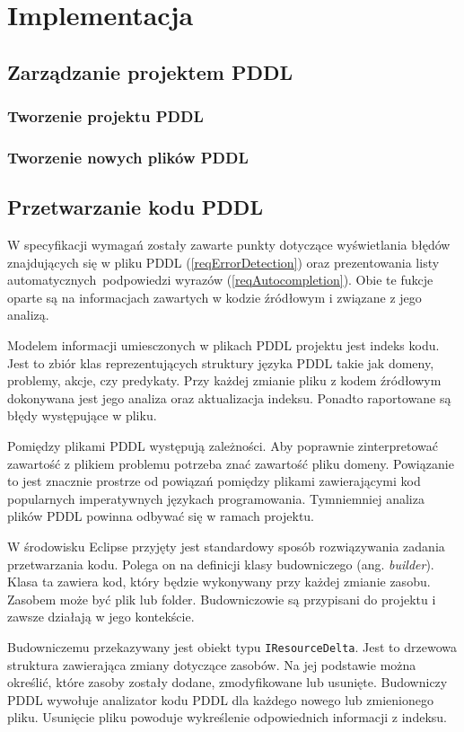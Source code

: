 \chapter{Implementacja}
\section{Zarządzanie projektem PDDL}
\subsection{Tworzenie projektu PDDL}
\subsection{Tworzenie nowych plików PDDL}


\section{Przetwarzanie kodu PDDL}
W specyfikacji wymagań zostały zawarte punkty dotyczące wyświetlania błędów znajdujących 
się w pliku PDDL (\ref{reqErrorDetection}) oraz prezentowania listy automatycznych\
podpowiedzi wyrazów (\ref{reqAutocompletion}).
Obie te fukcje oparte są na informacjach zawartych w kodzie źródłowym i związane
z jego analizą.

Modelem informacji umiesczonych w plikach PDDL projektu jest indeks kodu. Jest to
zbiór klas reprezentujących struktury języka PDDL takie jak domeny, problemy, akcje, czy predykaty.
Przy każdej zmianie pliku z kodem źródłowym dokonywana jest jego analiza oraz
aktualizacja indeksu. Ponadto raportowane są błędy występujące w pliku.

Pomiędzy plikami PDDL występują zależności. Aby poprawnie zinterpretować zawartość z plikiem
problemu potrzeba znać zawartość pliku domeny. Powiązanie to jest znacznie prostrze od 
powiązań pomiędzy plikami zawierającymi kod popularnych imperatywnych językach programowania.
Tymniemniej analiza plików PDDL powinna odbywać się w ramach projektu.

W środowisku Eclipse przyjęty jest standardowy sposób rozwiązywania zadania przetwarzania
kodu. Polega on na definicji klasy budowniczego (ang. \emph{builder}). Klasa ta
zawiera kod, który będzie wykonywany przy każdej zmianie zasobu. Zasobem
może być plik lub folder. Budowniczowie
są przypisani do projektu i zawsze działają w jego kontekście.

Budowniczemu przekazywany jest obiekt typu \texttt{IResourceDelta}. Jest to drzewowa
struktura zawierająca zmiany dotyczące zasobów. Na jej podstawie można określić, 
które zasoby zostały dodane, zmodyfikowane lub usunięte. Budowniczy PDDL wywołuje analizator
kodu PDDL dla każdego nowego lub zmienionego pliku. Usunięcie pliku powoduje wykreślenie
odpowiednich informacji z indeksu.

